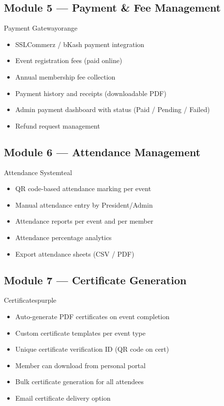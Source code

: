 \documentclass[12pt,a4paper]{article}
\begin{document}
\subsection{Module 5 --- Payment \& Fee Management}
\begin{modulebox}{Payment Gateway}{orange}
\begin{itemize}[leftmargin=*, itemsep=3pt]
  \item SSLCommerz / bKash payment integration
  \item Event registration fees (paid online)
  \item Annual membership fee collection
  \item Payment history and receipts (downloadable PDF)
  \item Admin payment dashboard with status (Paid / Pending / Failed)
  \item Refund request management
\end{itemize}
\end{modulebox}

\subsection{Module 6 --- Attendance Management}
\begin{modulebox}{Attendance System}{teal}
\begin{itemize}[leftmargin=*, itemsep=3pt]
  \item QR code-based attendance marking per event
  \item Manual attendance entry by President/Admin
  \item Attendance reports per event and per member
  \item Attendance percentage analytics
  \item Export attendance sheets (CSV / PDF)
\end{itemize}
\end{modulebox}

\subsection{Module 7 --- Certificate Generation}
\begin{modulebox}{Certificates}{purple}
\begin{itemize}[leftmargin=*, itemsep=3pt]
  \item Auto-generate PDF certificates on event completion
  \item Custom certificate templates per event type
  \item Unique certificate verification ID (QR code on cert)
  \item Member can download from personal portal
  \item Bulk certificate generation for all attendees
  \item Email certificate delivery option
\end{itemize}
\end{modulebox}
\end{document}
